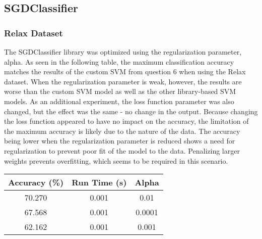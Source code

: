\documentclass[letterpaper]{article}
\begin{document}
\subsection{SGDClassifier}
\subsubsection{Relax Dataset}
The SGDClassifier library was optimized using the regularization parameter, alpha. As seen in the following table, the maximum classification accuracy matches the results of the custom SVM from question 6 when using the Relax dataset. When the regularization parameter is weak, however, the results are worse than the custom SVM model as well as the other library-based SVM models. As an additional experiment, the loss function parameter was also changed, but the effect was the same - no change in the output. Because changing the loss function appeared to have no impact on the accuracy, the limitation of the maximum accuracy is likely due to the nature of the data. The accuracy being lower when the regularization parameter is reduced shows a need for regularization to prevent poor fit of the model to the data. Penalizing larger weights prevents overfitting, which seems to be required in this scenario.
\begin{center}
\begin{tabular}{|c c c|} 
 \hline
 Accuracy (\%) & Run Time (s) & Alpha \\
 \hline
 70.270 & 0.001 & 0.01 \\ 
 \hline
 67.568 & 0.001 & 0.0001 \\
 \hline
 62.162 & 0.001 & 0.001 \\
 \hline
\end{tabular}
\end{center}
\end{document}
